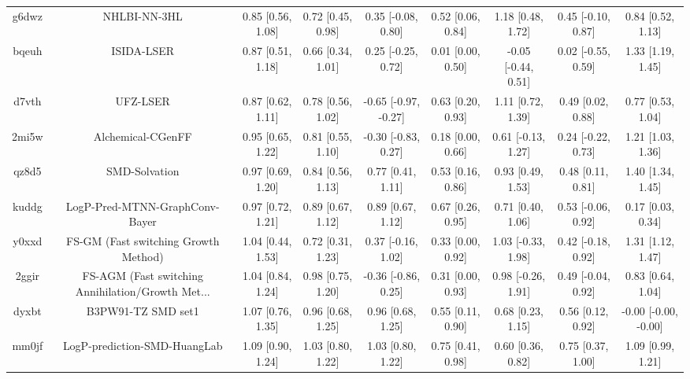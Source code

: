 \documentclass{article}
\begin{document}
\begin{center}
\begin{longtable}{|ccccccccc|}
 g6dwz &                                       NHLBI-NN-3HL &  0.85 [0.56, 1.08] &  0.72 [0.45, 0.98] &    0.35 [-0.08, 0.80] &  0.52 [0.06, 0.84] &    1.18 [0.48, 1.72] &   0.45 [-0.10, 0.87] &     0.84 [0.52, 1.13] \\
 bqeuh &                                         ISIDA-LSER &  0.87 [0.51, 1.18] &  0.66 [0.34, 1.01] &    0.25 [-0.25, 0.72] &  0.01 [0.00, 0.50] &  -0.05 [-0.44, 0.51] &   0.02 [-0.55, 0.59] &     1.33 [1.19, 1.45] \\
 d7vth &                                           UFZ-LSER &  0.87 [0.62, 1.11] &  0.78 [0.56, 1.02] &  -0.65 [-0.97, -0.27] &  0.63 [0.20, 0.93] &    1.11 [0.72, 1.39] &    0.49 [0.02, 0.88] &     0.77 [0.53, 1.04] \\
 2mi5w &                                  Alchemical-CGenFF &  0.95 [0.65, 1.22] &  0.81 [0.55, 1.10] &   -0.30 [-0.83, 0.27] &  0.18 [0.00, 0.66] &   0.61 [-0.13, 1.27] &   0.24 [-0.22, 0.73] &     1.21 [1.03, 1.36] \\
 qz8d5 &                                      SMD-Solvation &  0.97 [0.69, 1.20] &  0.84 [0.56, 1.13] &     0.77 [0.41, 1.11] &  0.53 [0.16, 0.86] &    0.93 [0.49, 1.53] &    0.48 [0.11, 0.81] &     1.40 [1.34, 1.45] \\
 kuddg &                     LogP-Pred-MTNN-GraphConv-Bayer &  0.97 [0.72, 1.21] &  0.89 [0.67, 1.12] &     0.89 [0.67, 1.12] &  0.67 [0.26, 0.95] &    0.71 [0.40, 1.06] &   0.53 [-0.06, 0.92] &     0.17 [0.03, 0.34] \\
 y0xxd &               FS-GM (Fast switching Growth Method) &  1.04 [0.44, 1.53] &  0.72 [0.31, 1.23] &    0.37 [-0.16, 1.02] &  0.33 [0.00, 0.92] &   1.03 [-0.33, 1.98] &   0.42 [-0.18, 0.92] &     1.31 [1.12, 1.47] \\
 2ggir &  FS-AGM (Fast switching Annihilation/Growth Met... &  1.04 [0.84, 1.24] &  0.98 [0.75, 1.20] &   -0.36 [-0.86, 0.25] &  0.31 [0.00, 0.93] &   0.98 [-0.26, 1.91] &   0.49 [-0.04, 0.92] &     0.83 [0.64, 1.04] \\
 dyxbt &                                 B3PW91-TZ SMD set1 &  1.07 [0.76, 1.35] &  0.96 [0.68, 1.25] &     0.96 [0.68, 1.25] &  0.55 [0.11, 0.90] &    0.68 [0.23, 1.15] &    0.56 [0.12, 0.92] &  -0.00 [-0.00, -0.00] \\
 mm0jf &                       LogP-prediction-SMD-HuangLab &  1.09 [0.90, 1.24] &  1.03 [0.80, 1.22] &     1.03 [0.80, 1.22] &  0.75 [0.41, 0.98] &    0.60 [0.36, 0.82] &    0.75 [0.37, 1.00] &     1.09 [0.99, 1.21] \\

\end{longtable}
\end{center}
\end{document}
